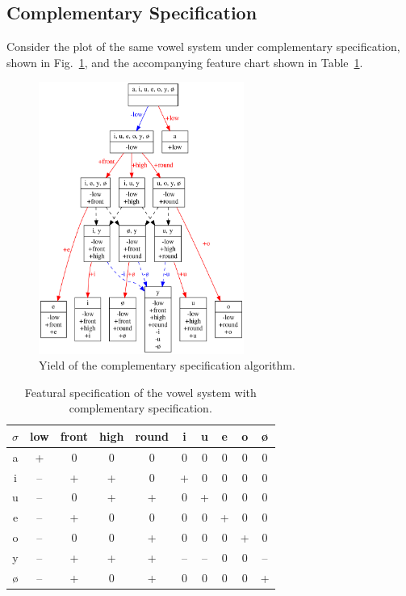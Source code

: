 \documentclass[12pt, oneside]{article}   	%
\begin{document}
\subsection{Complementary Specification}

Consider the plot of the same vowel system under complementary specification, shown in Fig.~\ref{fig:vowel_inventory_complementary}, and the accompanying feature chart shown in Table~\ref{table:vowel_inventory_complementary}.

\begin{figure}[htb!]
	\centering
	\includegraphics[width=0.6\textwidth]{vowel_inventory_complementary.png}
	\caption{Yield of the complementary specification algorithm.}
	\label{fig:vowel_inventory_complementary}
\end{figure}

\begin{table}[htb!]
	\centering
	\begin{tabular} {|c||c|c|c|c|c|c|c|c|c|}
		\hline
		$\sigma$ & low & front & high & round & i & u & e & o & \o \\ \hline
		a & + & 0 & 0 & 0 & 0 & 0 & 0 & 0 & 0\\
		i & -- & + & + & 0 & + & 0 & 0 & 0 & 0\\
		u & -- & 0 & + & + & 0 & + & 0 & 0 & 0 \\
		e & -- & + & 0 & 0 & 0 & 0 & + & 0 & 0 \\
		o & -- & 0 & 0 & + & 0 & 0 & 0 & + & 0 \\
		y & -- & + & + & + & -- & -- & 0 & 0 & -- \\
		\o & -- & + & 0 & + & 0 & 0 & 0 & 0 & + \\
		\hline
	\end{tabular}
	\caption{Featural specification of the vowel system with complementary specification.}
	\label{table:vowel_inventory_complementary}
\end{table}
\end{document}
